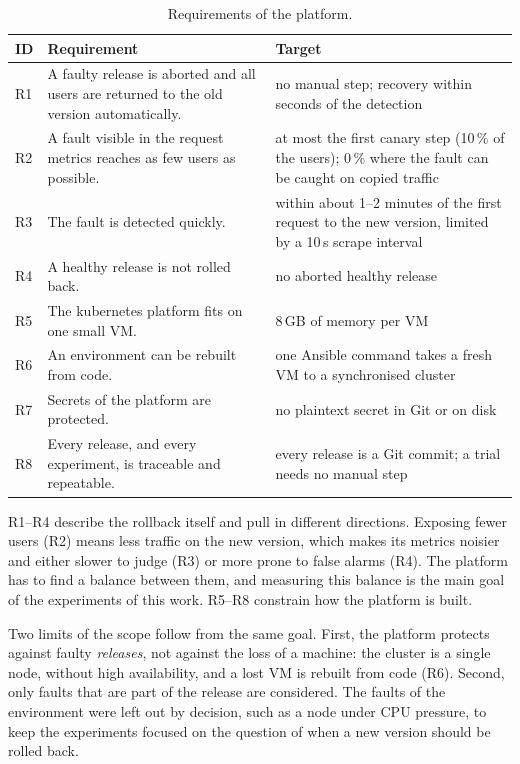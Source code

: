 \begin{table}[ht]
	\footnotesize
	\centering
	\begin{tabular}{ l p{6.6cm} p{6.6cm} }
		\toprule
		ID & Requirement & Target \\
		\midrule
		R1 & A faulty release is aborted and all users are returned to the old version automatically. & no manual step; recovery within seconds of the detection \\ \addlinespace
		R2 & A fault visible in the request metrics reaches as few users as possible. & at most the first canary step (10\,\% of the users); 0\,\% where the fault can be caught on copied traffic \\ \addlinespace
		R3 & The fault is detected quickly. & within about 1--2 minutes of the first request to the new version, limited by a 10\,s scrape interval \\ \addlinespace
		R4 & A healthy release is not rolled back. & no aborted healthy release \\ \addlinespace
		R5 & The kubernetes platform fits on one small VM. & 8\,GB of memory per VM \\ \addlinespace
		R6 & An environment can be rebuilt from code. & one Ansible command takes a fresh VM to a synchronised cluster \\ \addlinespace
		R7 & Secrets of the platform are protected. & no plaintext secret in Git or on disk \\ \addlinespace
		R8 & Every release, and every experiment, is traceable and repeatable. & every release is a Git commit; a trial needs no manual step \\
		\bottomrule
	\end{tabular}
	\caption{Requirements of the platform.}
	\label{tab:DesignRequirements}
\end{table}

R1--R4 describe the rollback itself and pull in different directions. Exposing fewer users (R2) means less traffic on the new version, which makes its metrics noisier and either slower to judge (R3) or more prone to false alarms (R4). The platform has to find a balance between them, and measuring this balance is the main goal of the experiments of this work. R5--R8 constrain how the platform is built.

Two limits of the scope follow from the same goal. First, the platform protects against faulty \emph{releases}, not against the loss of a machine: the cluster is a single node, without high availability, and a lost VM is rebuilt from code (R6). Second, only faults that are part of the release are considered. The faults of the environment were left out by decision, such as a node under CPU pressure, to keep the experiments focused on the question of when a new version should be rolled back.

